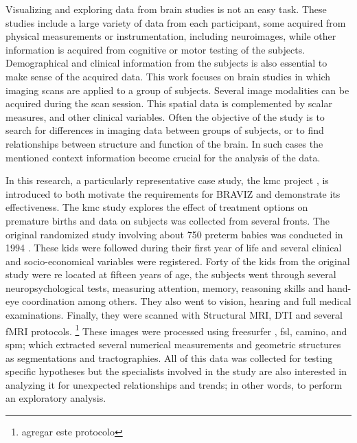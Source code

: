 \documentclass{frontiersSCNS} %
\begin{document}
Visualizing and exploring data from brain studies is not an easy task. These studies include a large variety of data from each participant, some acquired from physical measurements or instrumentation, including neuroimages, while other information is acquired from cognitive or motor testing of the subjects. Demographical and clinical information from the subjects is also essential to make sense of the acquired data.
This work focuses on brain studies in which imaging scans are applied to a group of subjects. Several image modalities can be acquired during the scan session. This spatial data is complemented by scalar measures, and other clinical variables. Often the objective of the study is to search for differences in imaging data between groups of subjects, or to find relationships between structure and function of the brain. In such cases the mentioned context information become crucial for the analysis of the data. 


In this research, a particularly representative case study, the kmc project \citep{schneider_cerebral_2012}, is introduced to both motivate the requirements for BRAVIZ and demonstrate its effectiveness. The kmc study explores the effect of treatment options on premature births and data on subjects was collected from several fronts. The original randomized study involving about 750 preterm babies was conducted in 1994 \citep{charpak_kangaroo_1997}. These kids were followed during their first year \citep{charpak_randomized_2001, tessier_kangaroo_2009} of life and several clinical and socio-economical variables were registered. Forty of the kids from the original study were re located at fifteen years of age, the  subjects went through several neuropsychological tests, measuring attention, memory, reasoning skills and hand-eye coordination among others. They also went to vision, hearing and full medical examinations. Finally, they were scanned with Structural MRI, DTI and several fMRI protocols. \footnote{agregar este protocolo} These images were processed using freesurfer \citep{fischl_freesurfer_2012}, fsl\citep{jenkinson_fsl_2012}, camino\citep{cook_camino:_2006}, and spm\citep{friston_statistical_2006}; which extracted several numerical measurements and geometric structures as segmentations and tractographies. All of this data was collected for testing specific hypotheses but the specialists involved in the study are also interested in analyzing it for unexpected relationships and trends; in other words, to perform an exploratory analysis\citep{tukey_we_1980}.
\end{document}
